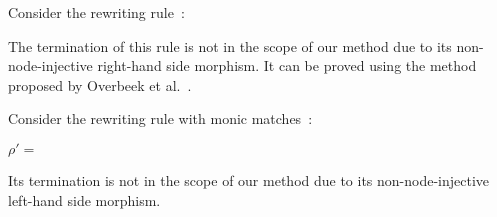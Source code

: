 \begin{example}[Limitation]
    \label{ex:overbeek:5d2:limitation}
    Consider the rewriting rule~\cite[Example 5.2]{overbeek2024termination_lmcs}:
  \begin{center} 
  \end{center}
    The termination of this rule is not in the scope of our method due to its non-node-injective right-hand side morphism. It can be proved using the method proposed by Overbeek et al.~\cite{overbeek2024termination_lmcs}.
\end{example}
 
\begin{example}[Limitation]
  \label{ex:overbeek:5d6_bis:limitation} 
  Consider the rewriting rule with monic matches~\cite[Example 5.6]{overbeek2024termination_lmcs}:
  \begin{center}
    $\rho'\mathop{=}$\scalebox{0.9} { }
  \end{center} 
  Its termination is not in the scope of our method due to its non-node-injective left-hand side morphism. 
\end{example}
